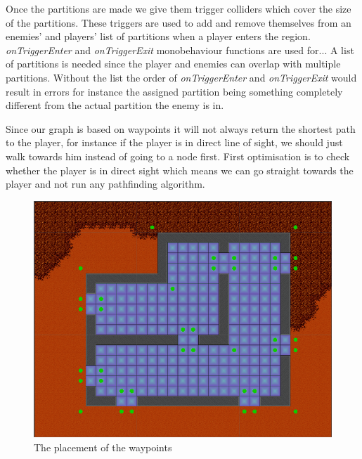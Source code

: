 Once the partitions are made we give them trigger colliders which cover the size of the partitions.
These triggers are used to add and remove themselves from an enemies' and players' list of partitions when a player enters the region.
\textit{onTriggerEnter} and \textit{onTriggerExit} monobehaviour functions are used for...
A list of partitions is needed since the player and enemies can overlap with multiple partitions.
Without the list the order of \textit{onTriggerEnter} and \textit{onTriggerExit} would result in errors for instance the assigned partition being something completely different from the actual partition the enemy is in.



Since our graph is based on waypoints it will not always return the shortest path to the player, for instance if the player is in direct line of sight, we should just walk towards him instead of going to a node first.
First optimisation is to check whether the player is in direct sight which means we can go straight towards the player and not run any pathfinding algorithm.
\begin{figure}[H]
	\includegraphics[width=\textwidth]{figures/astar/waypoints}
	\caption{The placement of the waypoints}
	\label{waypointsNode}
\end{figure}

